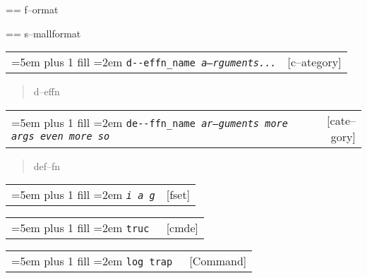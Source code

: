 \documentclass{book}
\makeatletter
\newcommand\GNUTexinfocommandstyletextvar[1]{{\normalfont{}\textsl{#1}}}%
\newenvironment{GNUTexinfopreformatted}{%
  \par\GNUTobeylines\obeyspaces\frenchspacing
  \parskip=\z@\parindent=\z@}{}
{\catcode`\^^M=13 \gdef\GNUTobeylines{\catcode`\^^M=13 \def^^M{\null\par}}}
\makeatother
\begin{document}
\begin{titlepage}
\begin{GNUTexinfopreformatted}%
f--ormat
\end{GNUTexinfopreformatted}

\begin{GNUTexinfopreformatted}%
\footnotesize s--mallformat
\end{GNUTexinfopreformatted}


\noindent\begin{tabularx}{\linewidth}{@{}Xr}
\rightskip=5em plus 1 fill
\hangindent=2em
\texttt{d{-}{-}effn\_name \EmbracOn{}\textnormal{\textsl{a--rguments...}}\EmbracOff{}}& [c--ategory]
\end{tabularx}

%
\begin{quote}
\unskip{\parskip=0pt\noindent}%
d--effn
\end{quote}


\noindent\begin{tabularx}{\linewidth}{@{}Xr}
\rightskip=5em plus 1 fill
\hangindent=2em
\texttt{de{-}{-}ffn\_name \EmbracOn{}\textnormal{\textsl{ar--guments    more args   even more so}}\EmbracOff{}}& [cate--gory]
\end{tabularx}

%
\begin{quote}
\unskip{\parskip=0pt\noindent}%
def--fn
\end{quote}


\noindent\begin{tabularx}{\linewidth}{@{}Xr}
\rightskip=5em plus 1 fill
\hangindent=2em
\texttt{\GNUTexinfocommandstyletextvar{i} \EmbracOn{}\textnormal{\textsl{a g}}\EmbracOff{}}& [fset]
\end{tabularx}

\index[fn]{i@\texttt{\GNUTexinfocommandstyletextvar{i}}}%
%

\noindent\begin{tabularx}{\linewidth}{@{}Xr}
\rightskip=5em plus 1 fill
\hangindent=2em
\texttt{truc \EmbracOn{}\textnormal{\textsl{}}\EmbracOff{}}& [cmde]
\end{tabularx}

%

\noindent\begin{tabularx}{\linewidth}{@{}Xr}
\rightskip=5em plus 1 fill
\hangindent=2em
\texttt{log trap \EmbracOn{}\textnormal{\textsl{}}\EmbracOff{}}& [Command]
\end{tabularx}


\end{titlepage}
\end{document}
